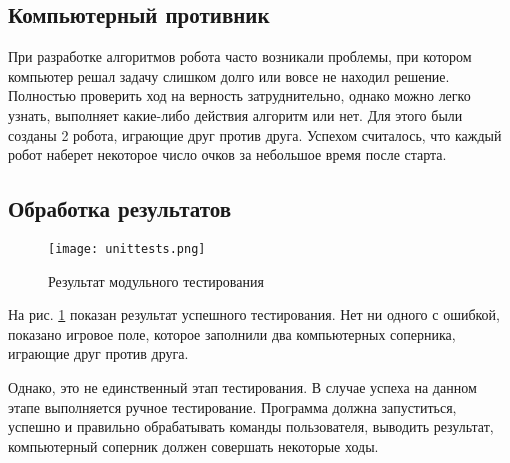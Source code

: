 \documentclass[a4paper,14pt]{article}
\begin{document}
	\subsection{Компьютерный противник}
	При разработке алгоритмов робота часто возникали проблемы, при котором компьютер решал задачу слишком долго или вовсе не находил решение. Полностью проверить ход на верность затруднительно, однако можно легко узнать, выполняет какие-либо действия алгоритм или нет. Для этого были созданы 2 робота, играющие друг против друга. Успехом считалось, что каждый робот наберет некоторое число очков за небольшое время после старта.
	
	\subsection{Обработка результатов}
	\begin{figure}[bhtp]
		\centering
		\caption{Результат модульного тестирования}
		\texttt{[image: unittests.png]}\label{img:tests}
	\end{figure}
	
	На рис. \ref{img:tests} показан результат успешного тестирования. Нет ни одного с ошибкой, показано игровое поле, которое заполнили два компьютерных соперника, играющие друг против друга.
	
	Однако, это не единственный этап тестирования. В случае успеха на данном этапе выполняется ручное тестирование. Программа должна запуститься, успешно и правильно обрабатывать команды пользователя, выводить результат, компьютерный соперник должен совершать некоторые ходы.
	
	
\end{document}
